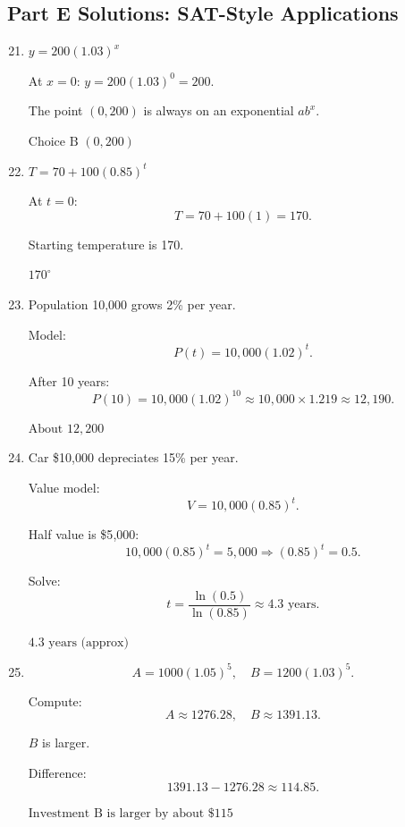 \documentclass[14pt]{extarticle}
\begin{document}
\subsection*{Part E Solutions: SAT-Style Applications}
\begin{enumerate}
  \setcounter{enumi}{20}
  \item \(y = 200(1.03)^x\)

  At \(x = 0\): \(y = 200(1.03)^0 = 200.\)

  The point \((0, 200)\) is always on an exponential \(a b^x\).

  \(\boxed{\text{Choice B } (0, 200)}\)

  \item \(T = 70 + 100(0.85)^t\)

  At \(t = 0\):
  \[
  T = 70 + 100(1) = 170.
  \]

  Starting temperature is 170.

  \(\boxed{170^\circ}\)

  \item Population 10{,}000 grows 2\% per year.

  Model:
  \[
  P(t) = 10{,}000(1.02)^t.
  \]

  After 10 years:
  \[
  P(10) = 10{,}000(1.02)^{10} \approx 10{,}000 \times 1.219 \approx 12{,}190.
  \]

  \(\boxed{\text{About } 12{,}200}\)

  \item Car \$10{,}000 depreciates 15\% per year.

  Value model:
  \[
  V = 10{,}000(0.85)^t.
  \]

  Half value is \$5{,}000:
  \[
  10{,}000(0.85)^t = 5{,}000
  \Rightarrow (0.85)^t = 0.5.
  \]

  Solve:
  \[
  t = \frac{\ln(0.5)}{\ln(0.85)} \approx 4.3 \text{ years}.
  \]

  \(\boxed{4.3 \text{ years (approx)}}\)

  \item
  \[
  A = 1000(1.05)^5, \quad
  B = 1200(1.03)^5.
  \]

  Compute:
  \[
  A \approx 1276.28,
  \quad
  B \approx 1391.13.
  \]

  \(B\) is larger.

  Difference:
  \[
  1391.13 - 1276.28 \approx 114.85.
  \]

  \(\boxed{\text{Investment B is larger by about \$115}}\)
\end{enumerate}





\end{document}
